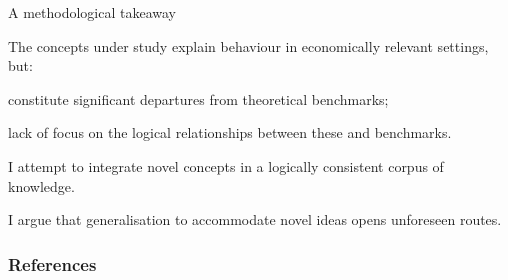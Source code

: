 \documentclass[usenames,dvipsnames,aspectratio=169,11pt]{beamer}
\begin{document}
\begin{frame}{A methodological takeaway}

	The concepts under study explain behaviour in economically relevant settings, but:

	\vfill

	\begin{wideitemize}
		\item constitute significant departures from theoretical benchmarks;
		\item lack of focus on the logical relationships between these and benchmarks.
	\end{wideitemize} \pause

	\vfill

	I attempt to integrate novel concepts in a logically consistent corpus of knowledge.

	\vfill

	I argue that generalisation to accommodate novel ideas opens unforeseen routes.

\end{frame}

\begin{frame}

	\frametitle{References}

	
	


\end{frame}
\end{document}
